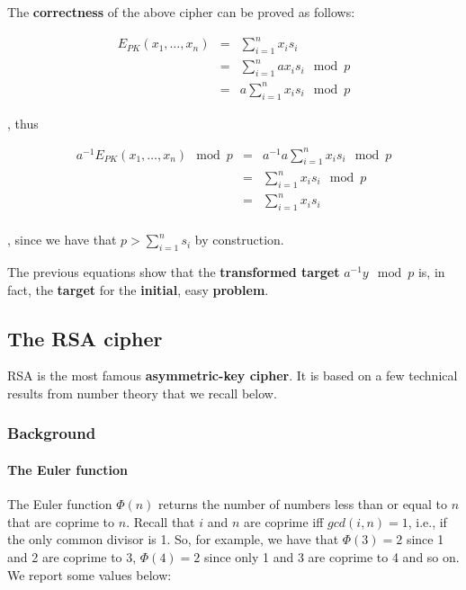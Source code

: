 The \textbf{correctness} of the above cipher can be proved as follows:

$$\begin{array}{rcl}E_{PK}(x_1, \ldots, x_n) &=& \sum_{i=1}^{n}{x_i \hat{s_i}}\\ & = & \sum_{i=1}^{n}{a x_i  s_i \mod p}\\& = & a\sum_{i=1}^{n}{x_i  s_i \mod p}\end{array}$$


, thus

$$\begin{array}{rcl}a^{-1}E_{PK}(x_1, \ldots, x_n) \mod p &=& a^{-1} a\sum_{i=1}^{n}{x_i  s_i \mod p}\\ &=& \sum_{i=1}^{n}{x_i  s_i \mod p}\\ &=& \sum_{i=1}^{n}{x_i  s_i}\\\end{array}$$

, since we have that $p > \sum_{i = 1}^n s_i$ by construction. 

The previous equations show that the \textbf{transformed target} $a^{-1} y \mod p$ is, in fact, the \textbf{target} for the \textbf{initial}, easy \textbf{problem}.


\subsection{The RSA cipher}
RSA is the most famous \textbf{asymmetric-key cipher}. It is based on a few technical results from number theory that we recall below.

\subsubsection{Background}

\paragraph{The Euler function} The Euler function $\Phi(n)$ returns the number of numbers less than or equal to $n$ that are coprime to $n$. Recall that $i$ and $n$ are coprime iff $gcd(i,n) = 1$, i.e., if the only common divisor is 1. So, for example, we have that $\Phi(3) = 2$ since 1 and 2 are coprime to 3, $\Phi(4) = 2$ since only 1 and 3 are coprime to 4 and so on. We report some values below:

